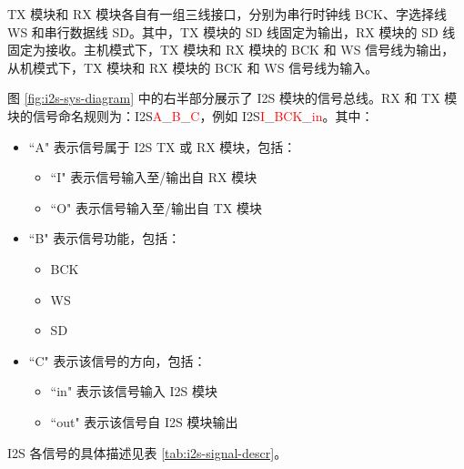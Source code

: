 \documentclass[main\_\_CN.tex]{subfiles}
\begin{document}
TX 模块和 RX 模块各自有一组三线接口，分别为串行时钟线 BCK、字选择线 WS 和串行数据线 SD。其中，TX 模块的 SD 线固定为输出，RX 模块的 SD 线固定为接收。主机模式下，TX 模块和 RX 模块的 BCK 和 WS 信号线为输出，从机模式下，TX 模块和 RX 模块的 BCK 和 WS 信号线为输入。

图 \ref{fig:i2s-sys-diagram} 中的右半部分展示了 I2S 模块的信号总线。RX 和 TX 模块的信号命名规则为：I2S\textcolor{red}{A}\_\textcolor{red}{B}\_\textcolor{red}{C}，例如 I2S\textcolor{red}{I}\_\textcolor{red}{BCK}\_\textcolor{red}{in}。其中：

\begin{itemize}
    \item ``A" 表示信号属于 I2S TX 或 RX 模块，包括：
    \begin{itemize}
        \item ``I" 表示信号输入至/输出自 RX 模块
        \item ``O" 表示信号输入至/输出自 TX 模块
    \end{itemize}
    \item ``B" 表示信号功能，包括：
    \begin{itemize}
        \item BCK
        \item WS
        \item SD
    \end{itemize}
    \item ``C" 表示该信号的方向，包括：
    \begin{itemize}
        \item ``in" 表示该信号输入 I2S 模块
        \item ``out" 表示该信号自 I2S 模块输出
    \end{itemize}
\end{itemize}

I2S 各信号的具体描述见表 \ref{tab:i2s-signal-descr}。
\end{document}
